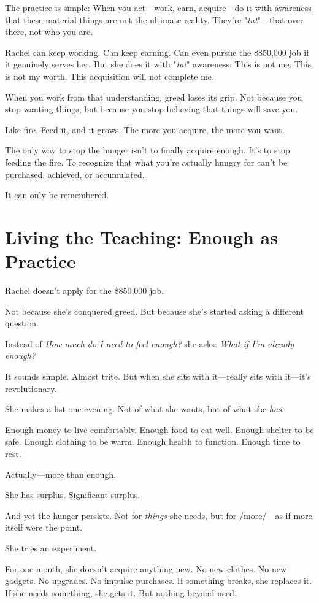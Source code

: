 \documentclass[11pt,twoside]{book}
\begin{document}
The practice is simple: When you act—work, earn, acquire—do it with awareness that these material things are not the ultimate reality. They're "\textit{tat}"—that over there, not who you are.

Rachel can keep working. Can keep earning. Can even pursue the \$850,000 job if it genuinely serves her. But she does it with "\textit{tat}" awareness: This is not me. This is not my worth. This acquisition will not complete me.

When you work from that understanding, greed loses its grip. Not because you stop wanting things, but because you stop believing that things will save you.

Like fire. Feed it, and it grows. The more you acquire, the more you want.

The only way to stop the hunger isn't to finally acquire enough. It's to stop feeding the fire. To recognize that what you're actually hungry for can't be purchased, achieved, or accumulated.

It can only be remembered.

\section*{Living the Teaching: Enough as Practice}

Rachel doesn't apply for the \$850,000 job.

Not because she's conquered greed. But because she's started asking a different question.

Instead of \emph{How much do I need to feel enough?} she asks: \emph{What if I'm already enough?}

It sounds simple. Almost trite. But when she sits with it—really sits with it—it's revolutionary.

She makes a list one evening. Not of what she wants, but of what she \emph{has}.

Enough money to live comfortably. Enough food to eat well. Enough shelter to be safe. Enough clothing to be warm. Enough health to function. Enough time to rest.

Actually—more than enough.

She has surplus. Significant surplus.

And yet the hunger persists. Not for \emph{things} she needs, but for /more/—as if more itself were the point.

She tries an experiment.

For one month, she doesn't acquire anything new. No new clothes. No new gadgets. No upgrades. No impulse purchases. If something breaks, she replaces it. If she needs something, she gets it. But nothing beyond need.
\end{document}
